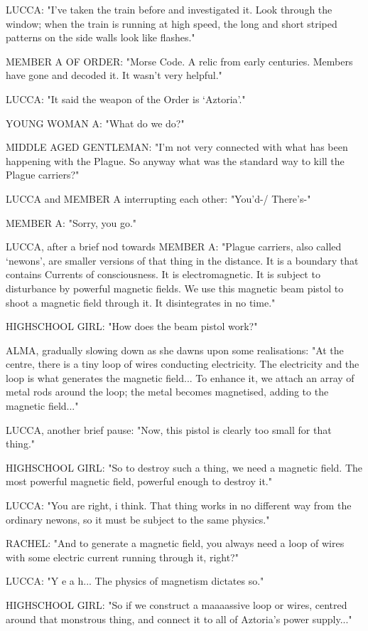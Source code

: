 \documentclass[11pt]{article}
\begin{document}
LUCCA: "I've taken the train before and investigated it.
Look through the window; when the train is running at high speed, the long and short striped patterns on the side walls look like flashes."

MEMBER A OF ORDER: "Morse Code. 
A relic from early centuries.
Members have gone and decoded it. 
It wasn't very helpful."

LUCCA: "It said the weapon of the Order is `Aztoria'."

YOUNG WOMAN A: "What do we do?"

MIDDLE AGED GENTLEMAN: "I'm not very connected with what has been happening with the Plague. 
So anyway what was the standard way to kill the Plague carriers?"

LUCCA and MEMBER A interrupting each other: "You'd-/ There's-"

MEMBER A: "Sorry, you go."

LUCCA, after a brief nod towards MEMBER A: "Plague carriers, also called `newons', are smaller versions of that thing in the distance. 
It is a boundary that contains Currents of consciousness. 
It is electromagnetic.
It is subject to disturbance by powerful magnetic fields.
We use this magnetic beam pistol to shoot a magnetic field through it.
It disintegrates in no time."

HIGHSCHOOL GIRL: "How does the beam pistol work?"

ALMA, gradually slowing down as she dawns upon some realisations: "At the centre, there is a tiny loop of wires conducting electricity. 
The electricity and the loop is what generates the magnetic field...
To enhance it, we attach an array of metal rods around the loop; the metal becomes magnetised, adding to the magnetic field..."

LUCCA, another brief pause: "Now, this pistol is clearly too small for that thing."

HIGHSCHOOL GIRL: "So to destroy such a thing, we need a magnetic field.
The most powerful magnetic field, powerful enough to destroy it."

LUCCA: "You are right, i think. That thing works in no different way from the ordinary newons, so it must be subject to the same physics."

RACHEL: "And to generate a magnetic field, you always need a loop of wires with some electric current running through it, right?"

LUCCA: "Y e a h... The physics of magnetism dictates so."

HIGHSCHOOL GIRL: "So if we construct a maaaassive loop or wires, centred around that monstrous thing, and connect it to all of Aztoria's power supply..."
\end{document}
